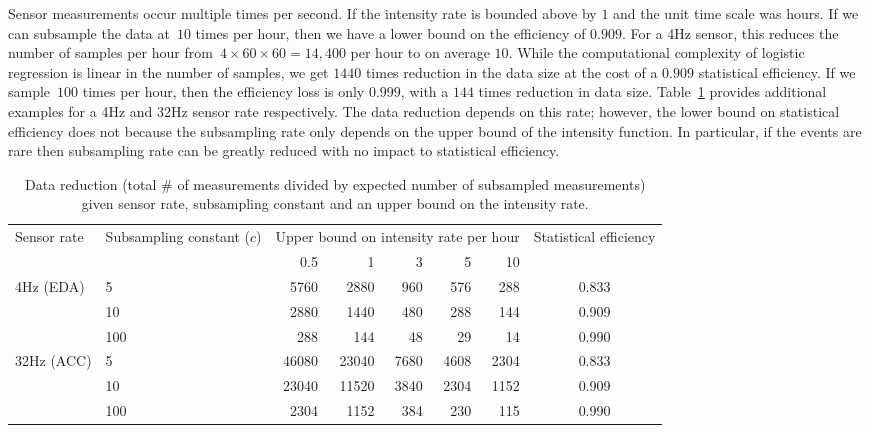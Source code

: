 \documentclass[11pt]{amsart}
\begin{document}
Sensor measurements occur multiple times per second.  If the intensity rate is bounded above by $1$ and the unit time scale was hours. If we can subsample the data at~$10$ times per hour, then we have a lower bound on the efficiency of $0.909$. For a 4Hz sensor, this reduces the number of samples per hour from~$4 \times 60 \times 60 = 14,400$ per hour to on average $10$. While the computational complexity of logistic regression is linear in the number of samples, we get $1440$ times reduction in the data size at the cost of a $0.909$ statistical efficiency. If we sample~$100$ times per hour, then the efficiency loss is only $0.999$, with a $144$ times reduction in data size. Table~\ref{tab:compvseff} provides additional examples for a 4Hz and 32Hz sensor rate respectively.  The data reduction depends on this rate; however, the lower bound on statistical efficiency does not because the subsampling rate only depends on the upper bound of the intensity function. In particular, if the events are rare then subsampling rate can be greatly reduced with no impact to statistical efficiency.

\begin{table}[!th]
\centering
\begin{tabular}{l l r r r r r | c}
\multirow{2}{2.5cm}{Sensor rate} &
\multirow{2}{2.5cm}{Subsampling constant ($c$)}
  & \multicolumn{5}{c}{Upper bound on intensity rate per
    hour}
  & \multirow{2}{2cm}{Statistical efficiency}\\ \cline{3-7}
& & 0.5 & 1 & 3 & 5 & 10 \\ \hline
\multirow{3}{*}{4Hz (EDA)}
& 5 & 5760 & 2880 & 960 & 576 & 288 & 0.833 \\
& 10 & 2880 & 1440 & 480 & 288 & 144 & 0.909 \\
& 100 & 288 & 144 & 48 & 29 & 14 & 0.990 \\ \hline
\multirow{3}{*}{32Hz (ACC)}
& 5 & 46080 & 23040 & 7680 & 4608 & 2304 & 0.833 \\
& 10 & 23040 & 11520 & 3840 & 2304 & 1152 & 0.909 \\
& 100 & 2304 & 1152 & 384 & 230 & 115 & 0.990 \\ \hline
\end{tabular}
\caption{Data reduction (total \# of measurements divided by expected number of subsampled measurements) given sensor rate, subsampling constant and an upper bound on the intensity rate.}
\label{tab:compvseff}
\end{table}
\end{document}
